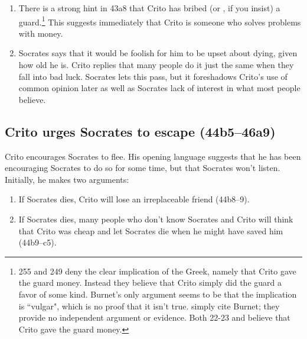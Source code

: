 \documentclass[11pt]{article}
\begin{document}
\begin{enumerate}

    \item There is a strong hint in 43a8 that Crito has bribed (or
        , if you insist) a guard.\footnote{\citet{burnet1924} 255
        and \citet{brickhouse2004} 249 deny the clear implication of the Greek,
        namely that Crito gave the guard money.  Instead they believe that
        Crito simply did the guard a favor of some kind.  Burnet's only
        argument seems to be that the implication is ``vulgar", which is no
        proof that it isn't true.  \citet{brickhouse2004} simply cite Burnet;
        they provide no independent argument or evidence.  Both
        \citet{adam1988} 22-23 and \citet{rose1983} believe that Crito gave the
        guard money.}  This suggests immediately that Crito is someone who
        solves problems with money.

    \item Socrates says that it would be foolish for him to be upset about
        dying, given how old he is.  Crito replies that many people do it just
        the same when they fall into bad luck.  Socrates lets this pass, but it
        foreshadows Crito's use of common opinion later as well as Socrates
        lack of interest in what most people believe.

\end{enumerate}


\subsection{Crito urges Socrates to escape (44b5--46a9)}

Crito encourages Socrates to flee.  His opening language suggests that he has
been encouraging Socrates to do so for some time, but that Socrates won't
listen.  Initially, he makes two arguments:

\begin{enumerate}

    \item If Socrates dies, Crito will lose an irreplaceable friend (44b8--9).

    \item If Socrates dies, many people who don't know Socrates and Crito will
        think that Crito was cheap and let Socrates die when he might have
        saved him (44b9--c5).

\end{enumerate}
\end{document}
